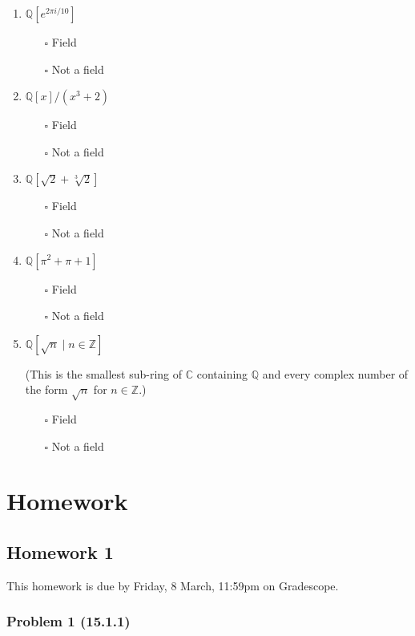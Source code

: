 \documentclass[11pt]{article}
\begin{document}
\begin{enumerate}
\item \(\mathbb{Q}[e^{2 \pi i / 10}]\)
\begin{itemize}
\item[{$\square$}] Field
\item[{$\square$}] Not a field
\end{itemize}
\item \(\mathbb{Q}[x]/(x^3+2)\)
\begin{itemize}
\item[{$\square$}] Field
\item[{$\square$}] Not a field
\end{itemize}
\item \(\mathbb{Q}[\sqrt 2 + \sqrt[3] 2 ]\)
\begin{itemize}
\item[{$\square$}] Field
\item[{$\square$}] Not a field
\end{itemize}
\item \(\mathbb{Q}[\pi^2 + \pi + 1]\)
\begin{itemize}
\item[{$\square$}] Field
\item[{$\square$}] Not a field
\end{itemize}
\item \(\mathbb{Q}[\sqrt n \mid n \in \mathbb{Z}]\)

(This is the smallest sub-ring of \(\mathbb{C}\) containing \(\mathbb{Q}\) and every complex number of the form \(\sqrt n\) for \(n \in \mathbb{Z}\).)

\begin{itemize}
\item[{$\square$}] Field
\item[{$\square$}] Not a field
\end{itemize}
\end{enumerate}
\section{Homework}
\label{sec:org7b98087}
\subsection{Homework 1}
\label{sec:org6727cdb}
This homework is due by Friday, 8 March, 11:59pm on Gradescope.
\subsubsection{Problem 1 (15.1.1)}
\label{sec:org5f73015}
\end{document}
